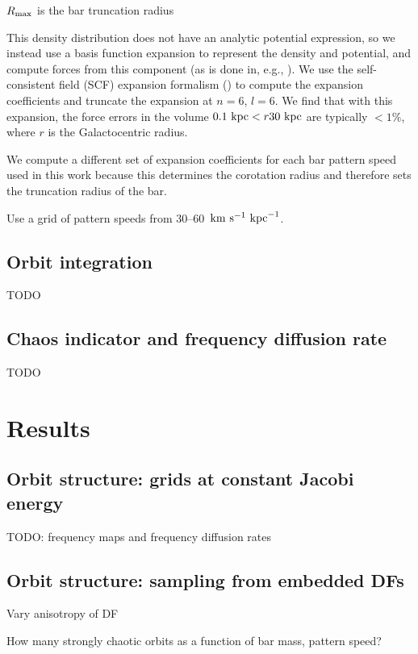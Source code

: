 \documentclass[modern]{aastex61}
\begin{document}
$R_{\rm max}$ is the bar truncation radius

This density distribution does not have an analytic potential expression, so
we instead use a basis function expansion to represent the density and
potential, and compute forces from this component (as is done in, e.g.,
\citealt{Wang:2012}).
We use the self-consistent field (SCF) expansion formalism
(\citealt{Hernquist:1992}) to compute the expansion coefficients and truncate
the expansion at $n=6$, $l=6$.
We find that with this expansion, the force errors in the volume $0.1~\mathrm{kpc} < r
30~\mathrm{kpc}$ are typically $<1\%$, where $r$ is the Galactocentric radius.

We compute a different set of expansion coefficients for each bar pattern speed
used in this work because this determines the corotation radius and therefore
sets the truncation radius of the bar.

Use a grid of pattern speeds from 30--60~$\mathrm{km}~\mathrm{s}^{-1}~\mathrm{kpc}^{-1}$.

\subsection{Orbit integration} \label{sec:orbit-int}

TODO

\subsection{Chaos indicator and frequency diffusion rate} \label{sec:freqdiff}

TODO

\section{Results} \label{sec:results}

\subsection{Orbit structure: grids at constant Jacobi energy}

TODO: frequency maps and frequency diffusion rates

\subsection{Orbit structure: sampling from embedded DFs}

Vary anisotropy of DF

How many strongly chaotic orbits as a function of bar mass, pattern speed?
\end{document}
